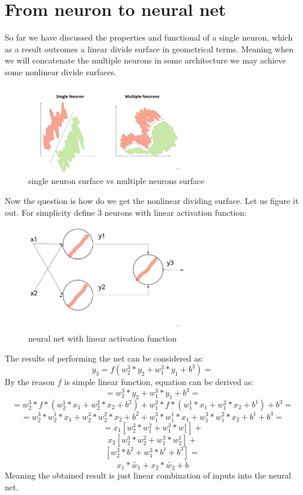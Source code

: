 \section{From neuron to neural net}
So far we have discussed the properties and functional of a single neuron, which as a result outcomes a linear divide surface in geometrical terms. Meaning when we will concatenate the multiple neurons in some architecture we may achieve some nonlinear divide surfaces.
\begin{figure}[h]
    \centering \includegraphics[width=7cm]{images/neuron_to_neural_net.jpg}
    \caption {single neuron surface vs multiple neurons surface}
\end{figure}

Now the question is how do we get the nonlinear dividing surface. Let us figure it out.
For simplicity define 3 neurons with linear activation function:
\begin{figure}[h]
    \centering \includegraphics[width=7cm]{images/3_neurons_net.jpg}
    \caption {neural net with linear activation function}
\end{figure}
The results of performing the net can be considered as:
\[ y_3 = f(w_2^3*y_2+ w_1^3*y_1+b^3) = \]
By the reason $f$ is simple linear function, equation can be derived as:
\[ = w_2^3*y_2+ w_1^3*y_1+b^3 = \] 
\[ = w_2^3*f*(w_2^1*x_1+w_2^2*x_2+b^2) + w_1^3*f*(w_1^1*x_1+w_1^2*x_2+b^1) + b^3 = \]   
\[ = w_2^3*w_2^1*x_1+w_2^3*w_2^2*x_2+b^2 + w_1^3*w_1^1*x_1+w_1^3*w_1^2*x_2+b^1+ b^3 = \]
\[ = x_1[w_2^3*w_1^2 + w_1^3*w_1^1] + \]
\[   x_2[w_2^3*w_2^2 + w_1^3*w_2^1] + \]
\[   [w_2^3*b^2 + w_1^3*b^1 + b^3]  = \]
\[   x_1*\tilde{w_1} + x_2*\tilde{w_2} + \tilde{b} \]
Meaning the obtained result is just linear combination of inputs into the neural net. 

